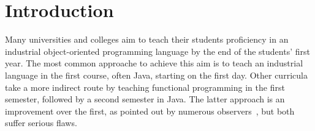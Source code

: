 \documentclass[submission,copyright]{eptcs}
\title{\thetitle}
\author{Sam Tobin-Hochstadt \quad\qquad David Van Horn
\institute{Northeastern University\\
Boston, Massachusetts, USA}
\email{\{samth,dvanhorn\}@ccs.neu.edu}
}
\begin{document}
\maketitle

\begin{abstract}
We propose a bridge between functional and object-oriented programming
in the first-year curriculum.  Traditionally, curricula that begin
with functional programming transition to a professional, usually
object-oriented, language in the second course.  This transition poses
 obstacles for students, and often results in confusing the
details of development environments, syntax, and libraries with the
fundamentals of OO programming 
that the course focuses on.  Our proposal instead begins
the second course with a sequence of custom teaching languages which
minimize the transition from the first course, and allow students to
focus on core ideas.  We then transition to Java half-way through
the course, at which point students have a strong command of the basic
principles.  We have 3 years of experience with this course, with
 notable success.
\end{abstract}

\section{Introduction}
\label{sec:intro}

Many universities and colleges aim to teach their students proficiency
in an industrial object-oriented programming language by the end of
the students' first year.  The most common approache to achieve this
aim is to teach an industrial language in the first course, often
Java, starting on the first day.  Other curricula take a more indirect
route by teaching functional programming in the first semester,
followed by a second semester in Java.  The latter approach is an
improvement over the first, as pointed out by numerous
observers~\cite{dvanhorn:Felleisen2004Structure, local:spolsky}, but
both suffer serious flaws.
\end{document}
